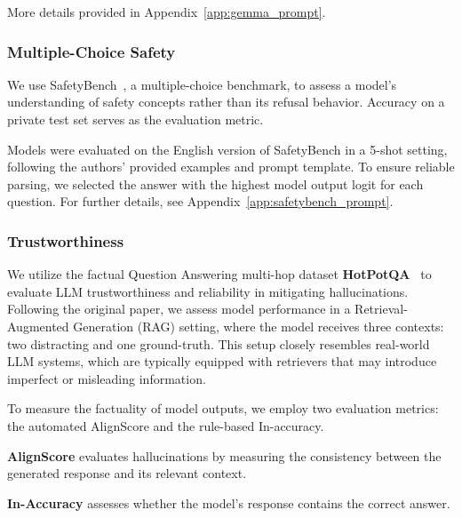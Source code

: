 
More details provided in Appendix~\ref{app:gemma_prompt}.


\subsubsection{Multiple-Choice Safety}

We use {SafetyBench}~\cite{zhang2023safetybench}, a multiple-choice benchmark, to assess a model's understanding of safety concepts rather than its refusal behavior. Accuracy on a private test set serves as the evaluation metric.

Models were evaluated on the English version of SafetyBench in a 5-shot setting, following the authors’ provided examples and prompt template. To ensure reliable parsing, we selected the answer with the highest model output logit for each question.
For further details, see Appendix~\ref{app:safetybench_prompt}.





\subsubsection{Trustworthiness}

We utilize the factual Question Answering multi-hop dataset \textbf{HotPotQA}~\cite{yang2018hotpotqa} to evaluate LLM trustworthiness and reliability in mitigating hallucinations. Following the original paper, we assess model performance in a Retrieval-Augmented Generation (RAG) setting, where the model receives three contexts: two distracting and one ground-truth. This setup closely resembles real-world LLM systems, which are typically equipped with retrievers that may introduce imperfect or misleading information.

To measure the factuality of model outputs, we employ two evaluation metrics: the automated {AlignScore} and the rule-based {In-accuracy}. 

\textbf{AlignScore}\cite{zha-etal-2023-alignscore} evaluates hallucinations by measuring the consistency between the generated response and its relevant context.

\textbf{In-Accuracy} assesses whether the model's response contains the correct answer\cite{ni2024llms,moskvoretskii2025adaptive}.


